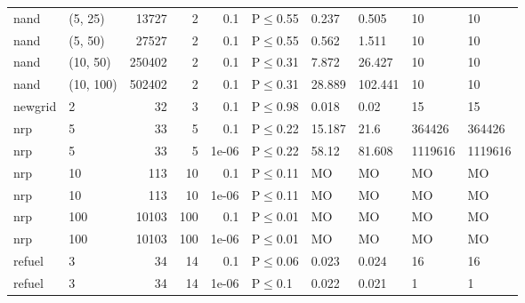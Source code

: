 \begin{longtable}{llrrrlllll}
 nand          & (5, 25)   &  	13727 &   2 & 0.1   & P$\leq$0.55  & 0.237  & 0.505   & 10      & 10      \\
 nand          & (5, 50)   &  	27527 &   2 & 0.1   & P$\leq$0.55  & 0.562  & 1.511   & 10      & 10      \\
 nand          & (10, 50)  & 	250402 &   2 & 0.1   & P$\leq$0.31  & 7.872  & 26.427  & 10      & 10      \\
 nand          & (10, 100) & 	502402 &   2 & 0.1   & P$\leq$0.31  & 28.889 & 102.441 & 10      & 10      \\
 newgrid       & 2         &     	32 &   3 & 0.1   & P$\leq$0.98  & 0.018  & 0.02    & 15      & 15      \\
 nrp           & 5         &     	33 &   5 & 0.1   & P$\leq$0.22  & 15.187 & 21.6    & 364426  & 364426  \\
 nrp           & 5         &     	33 &   5 & 1e-06 & P$\leq$0.22  & 58.12  & 81.608  & 1119616 & 1119616 \\
 nrp           & 10        &    	113 &  10 & 0.1   & P$\leq$0.11  & MO     & MO      & MO      & MO      \\
 nrp           & 10        &    	113 &  10 & 1e-06 & P$\leq$0.11  & MO     & MO      & MO      & MO      \\
 nrp           & 100       &  	10103 & 100 & 0.1   & P$\leq$0.01  & MO     & MO      & MO      & MO      \\
 nrp           & 100       &  	10103 & 100 & 1e-06 & P$\leq$0.01  & MO     & MO      & MO      & MO      \\
 refuel        & 3         &     	34 &  14 & 0.1   & P$\leq$0.06  & 0.023  & 0.024   & 16      & 16      \\
 refuel        & 3         &     	34 &  14 & 1e-06 & P$\leq$0.1   & 0.022  & 0.021   & 1       & 1       \\
\bottomrule
\end{longtable}
